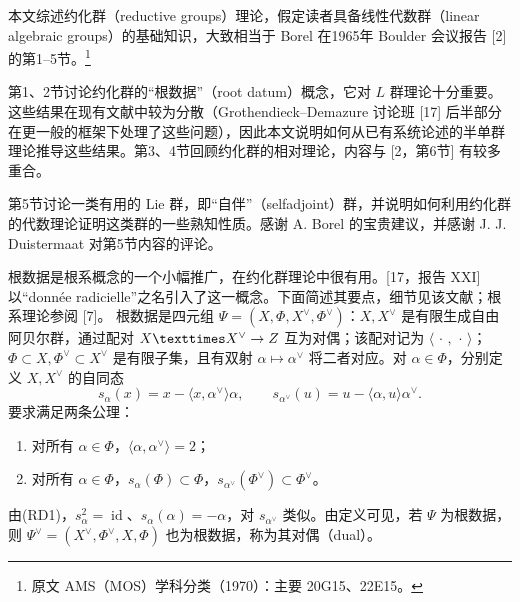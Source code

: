 本文综述约化群（reductive groups）理论，假定读者具备线性代数群（linear algebraic groups）的基础知识，大致相当于 Borel 在1965年 Boulder 会议报告 [2] 的第1--5节。\nobreak\footnote{原文 AMS（MOS）学科分类（1970）：主要 20G15、22E15。}

第1、2节讨论约化群的“根数据”（root datum）概念，它对 $L$ 群理论十分重要。这些结果在现有文献中较为分散（Grothendieck--Demazure 讨论班 [17] 后半部分在更一般的框架下处理了这些问题），因此本文说明如何从已有系统论述的半单群理论推导这些结果。第3、4节回顾约化群的相对理论，内容与 [2，第6节] 有较多重合。

第5节讨论一类有用的 Lie 群，即“自伴”（selfadjoint）群，并说明如何利用约化群的代数理论证明这类群的一些熟知性质。感谢 A. Borel 的宝贵建议，并感谢 J. J. Duistermaat 对第5节内容的评论。

根数据是根系概念的一个小幅推广，在约化群理论中很有用。[17，报告 XXI] 以“donnée radicielle”之名引入了这一概念。下面简述其要点，细节见该文献；根系理论参阅 [7]。
根数据是四元组 $\Psi=(X,\Phi,X^\vee,\Phi^\vee)$：$X,X^\vee$ 是有限生成自由阿贝尔群，通过配对 $X\times X^\vee\to\Z$ 互为对偶；该配对记为 $\langle\,\cdot\,,\,\cdot\,\rangle$；$\Phi\subset X,\Phi^\vee\subset X^\vee$ 是有限子集，且有双射 $\alpha\mapsto\alpha^\vee$ 将二者对应。对 $\alpha\in\Phi$，分别定义 $X,X^\vee$ 的自同态
\[
 s_\alpha(x)=x-\langle x,\alpha^\vee\rangle\alpha,
 \qquad s_{\alpha^\vee}(u)=u-\langle\alpha,u\rangle\alpha^\vee.
\]
要求满足两条公理：
\begin{enumerate}
\item[(RD1)] 对所有 $\alpha\in\Phi$，$\langle\alpha,\alpha^\vee\rangle=2$；
\item[(RD2)] 对所有 $\alpha\in\Phi$，$s_\alpha(\Phi)\subset\Phi$，$s_{\alpha^\vee}(\Phi^\vee)\subset\Phi^\vee$。
\end{enumerate}
由(RD1)，$s_\alpha^2=\operatorname{id}$、$s_\alpha(\alpha)=-\alpha$，对 $s_{\alpha^\vee}$ 类似。由定义可见，若 $\Psi$ 为根数据，则 $\Psi^\vee=(X^\vee,\Phi^\vee,X,\Phi)$ 也为根数据，称为其对偶（dual）。

